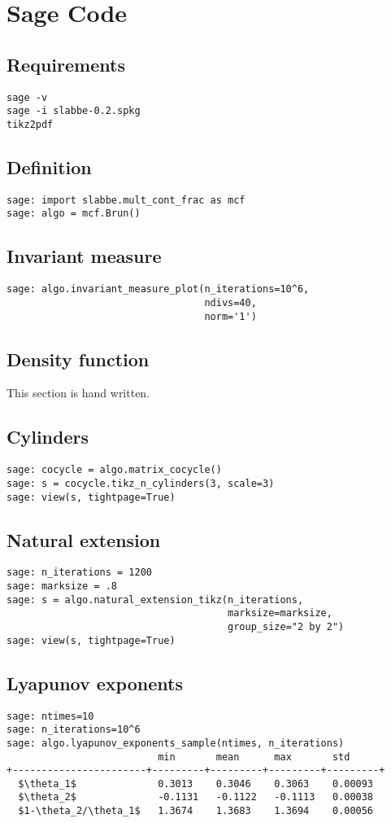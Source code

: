 \section{Sage Code}
\begin{refsegment}
\subsection{Requirements}
\begin{verbatim}
sage -v
sage -i slabbe-0.2.spkg
tikz2pdf
\end{verbatim}
\subsection{Definition}
\begin{verbatim}
sage: import slabbe.mult_cont_frac as mcf
sage: algo = mcf.Brun()
\end{verbatim}
\subsection{Invariant measure}
\begin{verbatim}
sage: algo.invariant_measure_plot(n_iterations=10^6,
                                  ndivs=40,
                                  norm='1')
\end{verbatim}
\subsection{Density function}
This section is hand written.
\subsection{Cylinders}
\begin{verbatim}
sage: cocycle = algo.matrix_cocycle()
sage: s = cocycle.tikz_n_cylinders(3, scale=3)
sage: view(s, tightpage=True)
\end{verbatim}
\subsection{Natural extension}
\begin{verbatim}
sage: n_iterations = 1200
sage: marksize = .8
sage: s = algo.natural_extension_tikz(n_iterations, 
                                      marksize=marksize,
                                      group_size="2 by 2")
sage: view(s, tightpage=True)
\end{verbatim}
\subsection{Lyapunov exponents}
\begin{verbatim}
sage: ntimes=10 
sage: n_iterations=10^6
sage: algo.lyapunov_exponents_sample(ntimes, n_iterations)
                          min       mean      max       std
+-----------------------+---------+---------+---------+---------+
  $\theta_1$              0.3013    0.3046    0.3063    0.00093
  $\theta_2$              -0.1131   -0.1122   -0.1113   0.00038
  $1-\theta_2/\theta_1$   1.3674    1.3683    1.3694    0.00056
\end{verbatim}

\end{refsegment}
